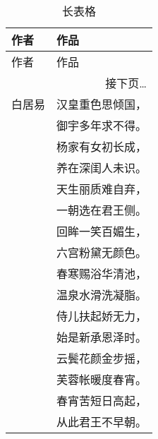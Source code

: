 \begin{longtable}{ll}
\caption{长表格} \\
    \toprule
    作者 & 作品 \\
    \midrule
    \endfirsthead
    \midrule
    作者 & 作品 \\
    \midrule
    \endhead
    \midrule
    \multicolumn{2}{r}{接下页\dots} \\
    \endfoot
    \bottomrule
    \endlastfoot
    白居易 & 汉皇重色思倾国，\\
    & 御宇多年求不得。\\
    & 杨家有女初长成，\\
    & 养在深闺人未识。\\
    & 天生丽质难自弃，\\
    & 一朝选在君王侧。\\
    & 回眸一笑百媚生，\\
    & 六宫粉黛无颜色。\\
    & 春寒赐浴华清池，\\
    & 温泉水滑洗凝脂。\\
    & 侍儿扶起娇无力，\\
    & 始是新承恩泽时。\\
    & 云鬓花颜金步摇，\\
    & 芙蓉帐暖度春宵。\\
    & 春宵苦短日高起，\\
    & 从此君王不早朝。\\
\end{longtable}



\newpage
